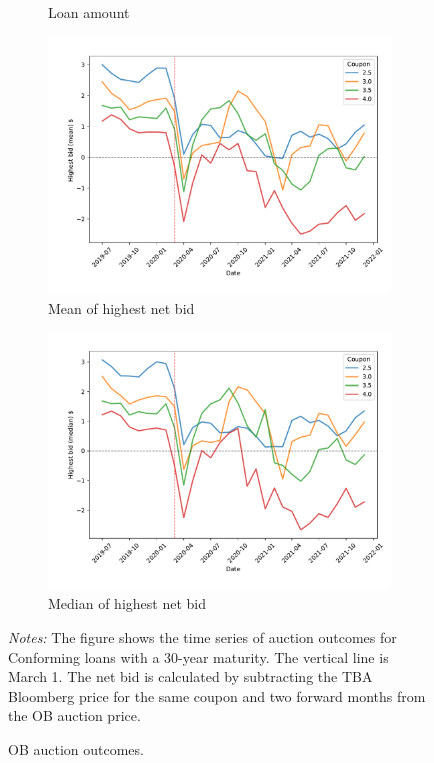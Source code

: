 \documentclass[11pt,a4paper]{article}
\begin{document}
\begin{figure}[h]
\begin{subfigure}[b]{0.49\textwidth}
      \caption{Loan amount}
     \end{subfigure}
     \begin{subfigure}[b]{0.49\textwidth}
      \includegraphics[width=0.998\textwidth]{../results/figures/winner_bid_mean_mat30_loan1_timeseries_cpmonthly_2.5_4__netbid.pdf}
      \caption{ Mean of highest net bid}
     \end{subfigure}
     \begin{subfigure}[b]{0.49\textwidth}
      \includegraphics[width=0.998\textwidth]{../results/figures/winner_bid_median_mat30_loan1_timeseries_cpmonthly_2.5_4__netbid.pdf}
      \caption{ Median of highest net bid}
     \end{subfigure}
   \caption{OB auction outcomes. } 
   \begin{minipage}{\textwidth}
      \footnotesize{\textit{Notes:} The figure shows the time series of auction outcomes for Conforming loans with a 30-year maturity.  The vertical line is March 1. The net bid is calculated by subtracting the TBA Bloomberg price for the same coupon and two forward months from the OB auction price. }
      \end{minipage}
\end{figure}
\end{document}
